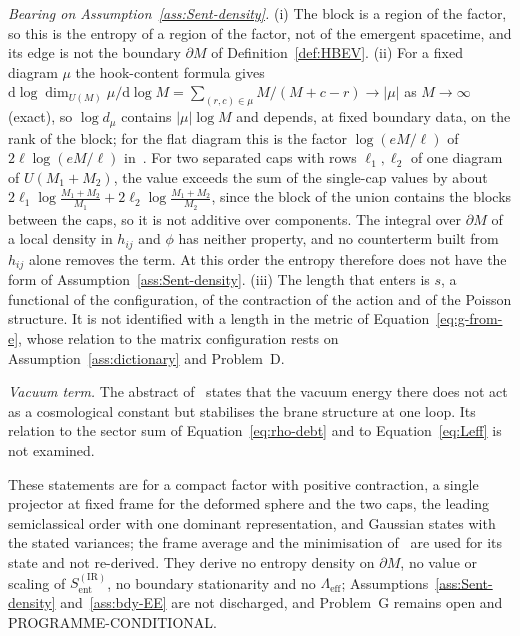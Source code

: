 \emph{Bearing on Assumption~\ref{ass:Sent-density}.} (i) The block is a region of the factor, so this is the entropy of a region of the factor, not of the emergent spacetime, and its edge is not the boundary \(\partial M\) of Definition~\ref{def:HBEV}. (ii) For a fixed diagram \(\mu\) the hook-content formula gives \(\mathrm d\log\dim_{U(M)}\mu/\mathrm d\log M=\sum_{(r,c)\in\mu}M/(M+c-r)\to|\mu|\) as \(M\to\infty\) (exact), so \(\log d_\mu\) contains \(|\mu|\log M\) and depends, at fixed boundary data, on the rank of the block; for the flat diagram this is the factor \(\log(eM/\ell)\) of \(2\ell\log(eM/\ell)\) in~\cite{FlissFrenkelHartnollSoni2025}. For two separated caps with rows \(\ell_1,\ell_2\) of one diagram of \(U(M_1+M_2)\), the value exceeds the sum of the single-cap values by about \(2\ell_1\log\frac{M_1+M_2}{M_1}+2\ell_2\log\frac{M_1+M_2}{M_2}\), since the block of the union contains the blocks between the caps, so it is not additive over components. The integral over \(\partial M\) of a local density in \(h_{ij}\) and \(\phi\) has neither property, and no counterterm built from \(h_{ij}\) alone removes the term. At this order the entropy therefore does not have the form of Assumption~\ref{ass:Sent-density}. (iii) The length that enters is \(s\), a functional of the configuration, of the contraction of the action and of the Poisson structure. It is not identified with a length in the metric of Equation~\eqref{eq:g-from-e}, whose relation to the matrix configuration rests on Assumption~\ref{ass:dictionary} and Problem~D.

\emph{Vacuum term.} The abstract of~\cite{Steinacker2023} states that the vacuum energy there does not act as a cosmological constant but stabilises the brane structure at one loop. Its relation to the sector sum of Equation~\eqref{eq:rho-debt} and to Equation~\eqref{eq:Leff} is not examined.

These statements are for a compact factor with positive contraction, a single projector at fixed frame for the deformed sphere and the two caps, the leading semiclassical order with one dominant representation, and Gaussian states with the stated variances; the frame average and the minimisation of~\cite{FlissFrenkelHartnollSoni2025} are used for its state and not re-derived. They derive no entropy density on \(\partial M\), no value or scaling of \(S_{\mathrm{ent}}^{\mathrm{(IR)}}\), no boundary stationarity and no \(\Lambda_{\mathrm{eff}}\); Assumptions~\ref{ass:Sent-density} and~\ref{ass:bdy-EE} are not discharged, and Problem~G remains open and PROGRAMME-CONDITIONAL.
